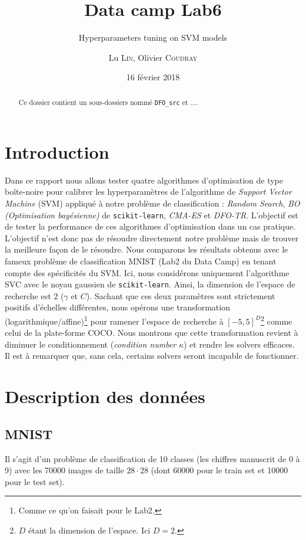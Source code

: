\documentclass[12 pt, a4paper]{article}
\title[Data camp 2018]{Data camp Lab6}
\subtitle{Hyperparameters tuning on SVM models}
\author{Lu \textsc{Lin}, Olivier \textsc{Coudray}}
\date{16 février 2018}
\begin{document}
\maketitle




\begin{abstract}
Ce dossier contient un sous-dossiers nommé \texttt{DFO\_src} et ....

\end{abstract}

\section{Introduction}
Dans ce rapport nous allons tester quatre algorithmes d'optimisation de type boîte-noire pour calibrer les hyperparamètres de l'algorithme de \textit{Support Vector Machine} (SVM) appliqué à notre problème de classification : \textit{Random Search}, \textit{BO (Optimisation bayésienne)} de \texttt{scikit-learn}, \textit{CMA-ES} et \textit{DFO-TR}. L'objectif est de tester la performance de ces algorithmes d'optimisation dans un cas pratique. L'objectif n'est donc pas de résoudre directement notre problème mais de trouver la meilleure façon de le résoudre. Nous comparons les résultats obtenus avec le fameux problème de classification MNIST (Lab2 du Data Camp) en tenant compte des spécificités du SVM. Ici, nous considérons uniquement l'algorithme SVC avec le noyau gaussien de \texttt{scikit-learn}. Ainsi, la dimension de l'espace de recherche est 2 ($\gamma$ et $C$). Sachant que ces deux paramètres sont strictement positifs d'échelles différentes, nous opérons une transformation (logarithmique/affine)\footnote{Comme ce qu'on faisait pour le Lab2.} pour ramener l'espace de recherche à $[-5, 5]^{D}$\footnote{$D$ étant la dimension de l'espace. Ici $D=2$.} comme celui de la plate-forme COCO. Nous montrons que cette transformation revient à diminuer le conditionnement (\textit{condition number} $\kappa$) et rendre les solvers efficaces. Il est à remarquer que, sans cela, certains solvers seront incapable de fonctionner.


\section{Description des données}
\subsection{MNIST}
Il s'agit d'un problème de classification de 10 classes (les chiffres manuscrit de 0 à 9) avec les 70000 images de taille $28\cdot 28$ (dont 60000 pour le train set et 10000 pour le test set).
\end{document}
